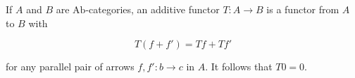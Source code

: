 If $A$ and $B$ are $\text{Ab}$-categories, an additive functor $T : A \rightarrow B$ is a functor from $A$ to $B$ with

$$T(f + f') = Tf + Tf'$$

for any parallel pair of arrows $f, f' : b \rightarrow c$ in $A$. It follows that $T0 = 0$.
